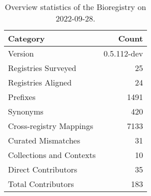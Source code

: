 \begin{table}
\centering
\caption{Overview statistics of the Bioregistry on 2022-09-28.}
\label{tab:bioregistry-summary}
\begin{tabular}{lr}
\toprule
                Category &       Count \\
\midrule
                 Version & 0.5.112-dev \\
     Registries Surveyed &          25 \\
      Registries Aligned &          24 \\
                Prefixes &        1491 \\
                Synonyms &         420 \\
 Cross-registry Mappings &        7133 \\
      Curated Mismatches &          31 \\
Collections and Contexts &          10 \\
     Direct Contributors &          35 \\
      Total Contributors &         183 \\
\bottomrule
\end{tabular}
\end{table}
